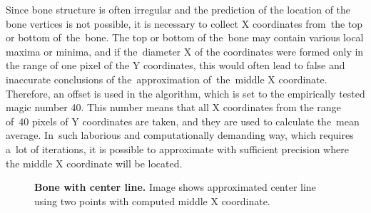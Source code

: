 Since bone structure is often irregular and the prediction of the location of the bone vertices is not possible, it is necessary to collect X coordinates from~the top or bottom of~the~bone. The top or bottom of the~bone may contain various local maxima or minima, and if the~diameter X of the coordinates were formed only in the range of one pixel of the Y coordinates, this would often lead to false and inaccurate conclusions of the~approximation of~the~middle X coordinate. Therefore, an offset is used in the algorithm, which is set to the empirically tested magic number 40. This number means that all X coordinates from the range of~40 pixels of Y coordinates are taken, and they are used to calculate the~mean average. In~such laborious and computationally demanding way, which requires a~lot of iterations, it is possible to approximate with sufficient precision where the middle X coordinate will be located.

\begin{figure}[!ht]
    \centering
    \caption{\textbf{Bone with center line.} Image shows approximated center line using two points with computed middle X coordinate.}
    \label{center-line}
\end{figure}


